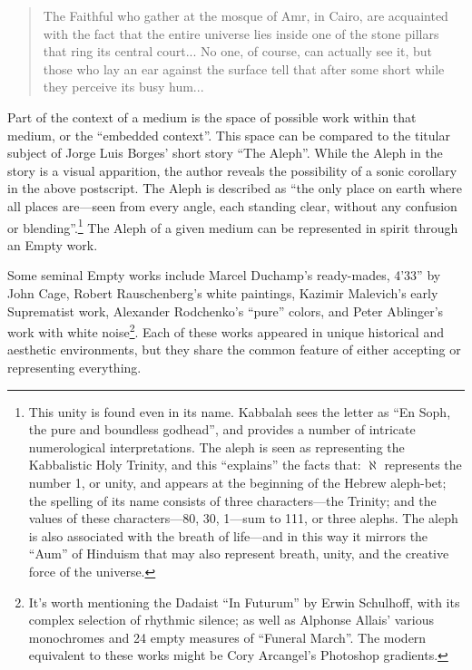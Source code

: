 \documentclass{thesis}
\begin{document}
	\begin{quote}
	The Faithful who gather at the mosque of Amr, in Cairo, are acquainted with the fact that the entire universe lies inside one of the stone pillars that ring its central court... No one, of course, can actually see it, but those who lay an ear against the surface tell that after some short while they perceive its busy hum...
	\end{quote}

Part of the context of a medium is the space of possible work within that medium, or the ``embedded context''. This space can be compared to the titular subject of Jorge Luis Borges' short story ``The Aleph''\cite{borges_aleph_2004}. While the Aleph in the story is a visual apparition, the author reveals the possibility of a sonic corollary in the above postscript. The Aleph is described as ``the only place on earth where all places are---seen from every angle, each standing clear, without any confusion or blending''.\footnote{This unity is found even in its name. Kabbalah sees the letter as ``En Soph, the pure and boundless godhead'', and provides a number of intricate numerological interpretations.\cite{_01:_2009} The aleph is seen as representing the Kabbalistic Holy Trinity, and this ``explains'' the facts that: $\aleph$ represents the number 1, or unity, and appears at the beginning of the Hebrew aleph-bet; the spelling of its name consists of three characters---the Trinity; and the values of these characters---80, 30, 1---sum to 111, or three alephs. The aleph is also associated with the breath of life---and in this way it mirrors the ``Aum'' of Hinduism that may also represent breath, unity, and the creative force of the universe.} The Aleph of a given medium can be represented in spirit through an Empty work.

Some seminal Empty works include Marcel Duchamp's ready-mades, 4'33'' by John Cage\cite{larry_j_solomon_sounds_1998}, Robert Rauschenberg's white paintings, Kazimir Malevich's early Suprematist work\cite{moma_kazimir_2006}, Alexander Rodchenko's ``pure'' colors\cite{moma_rodchenko_1998}, and Peter Ablinger's work with white noise\footnote{It's worth mentioning the Dadaist ``In Futurum'' by   Erwin Schulhoff, with its complex selection of rhythmic silence; as well as Alphonse Allais' various monochromes and 24 empty measures of ``Funeral March''. The modern equivalent to these works might be Cory Arcangel's Photoshop gradients.\cite{cory_arcangel_photoshop_2009}}. Each of these works appeared in unique historical and aesthetic environments, but they share the common feature of either accepting or representing everything.
\end{document}
